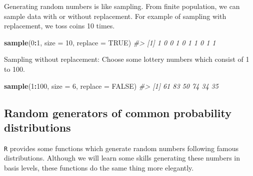 \documentclass[]{book}
\newenvironment{Shaded}{\begin{snugshade}}{\end{snugshade}}
\newcommand{\CommentTok}[1]{\textcolor[rgb]{0.56,0.35,0.01}{\textit{#1}}}
\newcommand{\DataTypeTok}[1]{\textcolor[rgb]{0.13,0.29,0.53}{#1}}
\newcommand{\DecValTok}[1]{\textcolor[rgb]{0.00,0.00,0.81}{#1}}
\newcommand{\KeywordTok}[1]{\textcolor[rgb]{0.13,0.29,0.53}{\textbf{#1}}}
\newcommand{\NormalTok}[1]{#1}
\newcommand{\OperatorTok}[1]{\textcolor[rgb]{0.81,0.36,0.00}{\textbf{#1}}}
\newcommand{\OtherTok}[1]{\textcolor[rgb]{0.56,0.35,0.01}{#1}}
\theoremstyle{definition}
\theoremstyle{definition}
\theoremstyle{definition}
\theoremstyle{remark}
\begin{document}
Generating random numbers is like sampling. From finite population, we can sample data with or without replacement. For example of sampling with replacement, we toss coins 10 times.

\begin{Shaded}
\begin{Highlighting}[]
\KeywordTok{sample}\NormalTok{(}\DecValTok{0}\OperatorTok{:}\DecValTok{1}\NormalTok{, }\DataTypeTok{size =} \DecValTok{10}\NormalTok{, }\DataTypeTok{replace =} \OtherTok{TRUE}\NormalTok{)}
\CommentTok{#>  [1] 1 0 0 1 0 1 1 0 1 1}
\end{Highlighting}
\end{Shaded}

Sampling without replacement: Choose some lottery numbers which consist of 1 to 100.

\begin{Shaded}
\begin{Highlighting}[]
\KeywordTok{sample}\NormalTok{(}\DecValTok{1}\OperatorTok{:}\DecValTok{100}\NormalTok{, }\DataTypeTok{size =} \DecValTok{6}\NormalTok{, }\DataTypeTok{replace =} \OtherTok{FALSE}\NormalTok{)}
\CommentTok{#> [1] 61 83 50 74 34 35}
\end{Highlighting}
\end{Shaded}

\hypertarget{random-generators-of-common-probability-distributions}{%
\subsection*{Random generators of common probability distributions}\label{random-generators-of-common-probability-distributions}}

\texttt{R} provides some functions which generate random numbers following famous distributions. Although we will learn some skills generating these numbers in basis levels, these functions do the same thing more elegantly.
\end{document}
